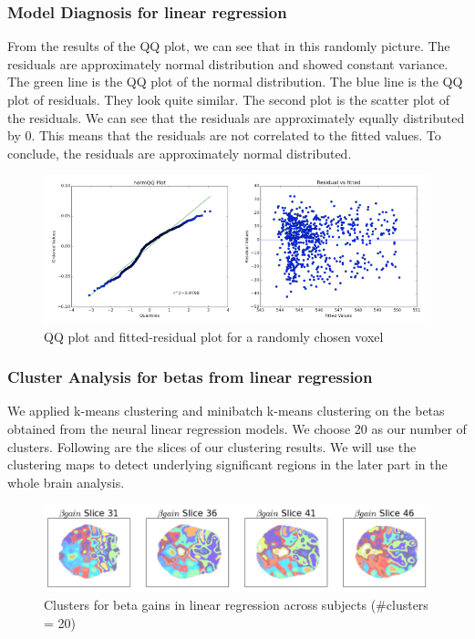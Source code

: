 \documentclass[11pt]{article}
\begin{document}
\subsubsection{Model Diagnosis for linear regression}

From the results of the QQ plot, we can see that in this randomly picture. The 
residuals are approximately normal distribution and showed constant variance. 
The green line is the QQ plot 
of the normal distribution. The blue line is the QQ plot of residuals. They 
look quite similar. The second plot is the scatter plot of the residuals. We 
can see that the residuals are approximately equally distributed by 0. This 
means that the residuals are not correlated to the fitted values. To conclude, 
the residuals are approximately normal distributed.

\begin{figure}[H]
    \centering
        \includegraphics[scale=0.4]{figures/Regression2/diagnosis.png}
    \caption{QQ plot and fitted-residual plot for a randomly chosen voxel}
\end{figure}

\subsubsection{Cluster Analysis for betas from linear regression}

We applied k-means clustering and minibatch k-means clustering on the betas 
obtained from the neural linear regression models. We choose 20 as our number 
of clusters. Following are the slices of our clustering results. We will use 
the clustering maps to detect underlying significant regions in the later part 
in the whole brain analysis.

\begin{figure}[H]
    \centering
        \includegraphics[scale=0.4]{figures/Regression2/beta_gain_cluster.png}
    \caption{Clusters for beta gains in linear regression across 
    subjects (\#clusters = 20)}
\end{figure}
\end{document}
